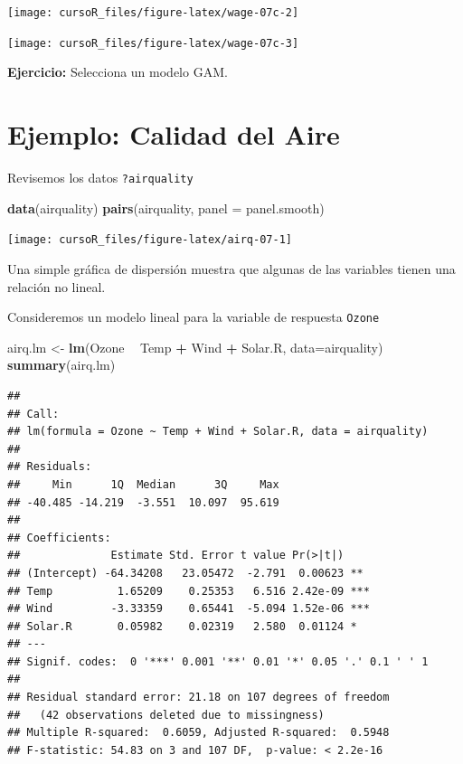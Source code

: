 \documentclass[]{book}
\newenvironment{Shaded}{\begin{snugshade}}{\end{snugshade}}
\newcommand{\KeywordTok}[1]{\textcolor[rgb]{0.13,0.29,0.53}{\textbf{#1}}}
\newcommand{\DataTypeTok}[1]{\textcolor[rgb]{0.13,0.29,0.53}{#1}}
\newcommand{\StringTok}[1]{\textcolor[rgb]{0.31,0.60,0.02}{#1}}
\newcommand{\OperatorTok}[1]{\textcolor[rgb]{0.81,0.36,0.00}{\textbf{#1}}}
\newcommand{\NormalTok}[1]{#1}
\begin{document}
\begin{center}\texttt{[image: cursoR\_files/figure-latex/wage-07c-2]} \end{center}

\begin{center}\texttt{[image: cursoR\_files/figure-latex/wage-07c-3]} \end{center}

\textbf{Ejercicio:} Selecciona un modelo GAM.

\section{Ejemplo: Calidad del Aire}\label{ejemplo-calidad-del-aire}

Revisemos los datos \texttt{?airquality}

\begin{Shaded}
\begin{Highlighting}[]
\KeywordTok{data}\NormalTok{(airquality)}
\KeywordTok{pairs}\NormalTok{(airquality, }\DataTypeTok{panel =}\NormalTok{ panel.smooth)}
\end{Highlighting}
\end{Shaded}

\begin{center}\texttt{[image: cursoR\_files/figure-latex/airq-07-1]} \end{center}

Una simple gráfica de dispersión muestra que algunas de las variables
tienen una relación no lineal.

Consideremos un modelo lineal para la variable de respuesta
\texttt{Ozone}

\begin{Shaded}
\begin{Highlighting}[]
\NormalTok{airq.lm <-}\StringTok{ }\KeywordTok{lm}\NormalTok{(Ozone }\OperatorTok{~}\StringTok{ }\NormalTok{Temp }\OperatorTok{+}\StringTok{ }\NormalTok{Wind }\OperatorTok{+}\StringTok{ }\NormalTok{Solar.R, }\DataTypeTok{data=}\NormalTok{airquality)}
\KeywordTok{summary}\NormalTok{(airq.lm)}
\end{Highlighting}
\end{Shaded}

\begin{verbatim}
## 
## Call:
## lm(formula = Ozone ~ Temp + Wind + Solar.R, data = airquality)
## 
## Residuals:
##     Min      1Q  Median      3Q     Max 
## -40.485 -14.219  -3.551  10.097  95.619 
## 
## Coefficients:
##              Estimate Std. Error t value Pr(>|t|)    
## (Intercept) -64.34208   23.05472  -2.791  0.00623 ** 
## Temp          1.65209    0.25353   6.516 2.42e-09 ***
## Wind         -3.33359    0.65441  -5.094 1.52e-06 ***
## Solar.R       0.05982    0.02319   2.580  0.01124 *  
## ---
## Signif. codes:  0 '***' 0.001 '**' 0.01 '*' 0.05 '.' 0.1 ' ' 1
## 
## Residual standard error: 21.18 on 107 degrees of freedom
##   (42 observations deleted due to missingness)
## Multiple R-squared:  0.6059, Adjusted R-squared:  0.5948 
## F-statistic: 54.83 on 3 and 107 DF,  p-value: < 2.2e-16
\end{verbatim}
\end{document}
